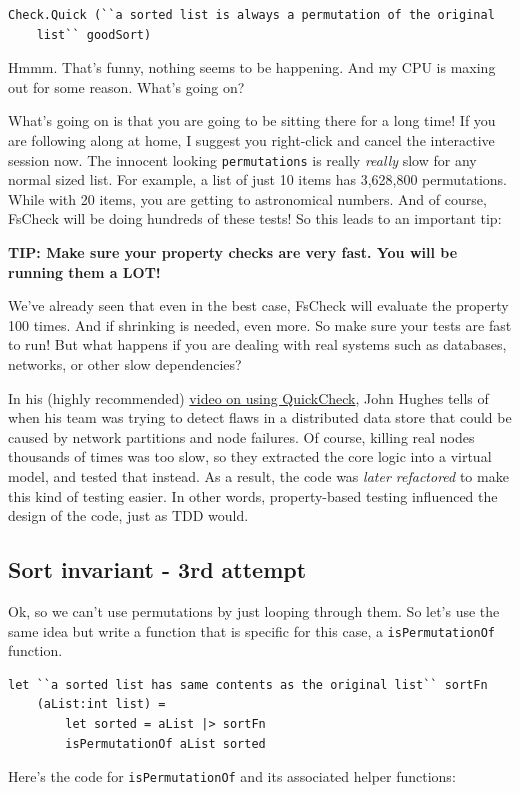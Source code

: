 \begin{verbatim}
Check.Quick (``a sorted list is always a permutation of the original 
    list`` goodSort)
\end{verbatim}
Hmmm. That's funny, nothing seems to be happening. And my CPU is maxing
out for some reason. What's going on?

What's going on is that you are going to be sitting there for a long
time! If you are following along at home, I suggest you right-click and
cancel the interactive session now.
The innocent looking \texttt{permutations} is really \emph{really} slow
for any normal sized list. For example, a list of just 10 items has
3,628,800 permutations. While with 20 items, you are getting to
astronomical numbers.
And of course, FsCheck will be doing hundreds of these tests! So this
leads to an important tip:

\textbf{TIP: Make sure your property checks are very fast. You will be
running them a LOT!}

We've already seen that even in the best case, FsCheck will evaluate the
property 100 times. And if shrinking is needed, even more. So make sure
your tests are fast to run!
But what happens if you are dealing with real systems such as databases,
networks, or other slow dependencies?

In his (highly recommended) \href{http://vimeo.com/68383317}{video on
using QuickCheck}, John Hughes tells of when his team was trying to
detect flaws in a distributed data store that could be caused by network
partitions and node failures.
Of course, killing real nodes thousands of times was too slow, so they
extracted the core logic into a virtual model, and tested that instead.
As a result, the code was \emph{later refactored} to make this kind of
testing easier. In other words, property-based testing influenced the
design of the code, just as TDD would.

\subsection{Sort invariant - 3rd
attempt}\label{sort-invariant---3rd-attempt}

Ok, so we can't use permutations by just looping through them. So let's
use the same idea but write a function that is specific for this case, a
\texttt{isPermutationOf} function.

\begin{verbatim}
let ``a sorted list has same contents as the original list`` sortFn 
    (aList:int list) = 
        let sorted = aList |> sortFn 
        isPermutationOf aList sorted
\end{verbatim}
Here's the code for \texttt{isPermutationOf} and its associated helper
functions:

